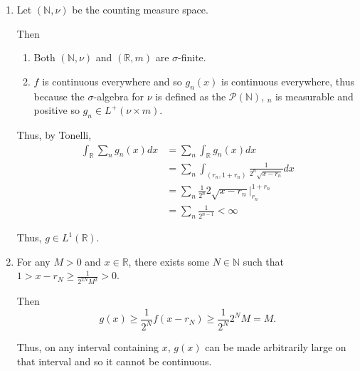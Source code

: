 \documentclass[12pt]{Homework}
\begin{document}
\begin{solution}$\,$
\begin{enumerate}[label=(\alph*)]
    \item Let $(\mathbb{N},\nu)$ be the counting measure space. 
    
    Then \begin{enumerate}[label=(\roman*)]
        \item Both $(\mathbb{N},\nu)$ and $(\mathbb{R},m)$ are $\sigma$-finite.
        \item $f$ is continuous everywhere and so $g_n(x)$ is continuous everywhere, thus because the $\sigma$-algebra for $\nu$ is defined as the $\mathscr{P}(\mathbb{N})$, $_n$ is measurable and positive so $g_n\in L^+(\nu\times m)$.
    \end{enumerate}
    
    Thus, by Tonelli, \begin{align*}
        \int_\mathbb{R}\sum_n g_n(x)dx&=\sum_n\int_\mathbb{R}g_n(x)dx\\
        &=\sum_n\int_{(r_n,1+r_n)}\frac{1}{2^n\sqrt{x-r_n}}dx\\
        &=\sum_n\frac{1}{2^n}2\sqrt{x-r_n}\bigg|_{r_n}^{1+r_n}\\
        &=\sum_n\frac{1}{2^{n-1}}<\infty
    \end{align*}
    
    Thus, $g\in L^1(\mathbb{R})$.
    \item For any $M>0$ and $x\in\mathbb{R}$, there exists some $N\in\mathbb{N}$ such that $1>x-r_N\ge\frac{1}{2^{2N}M^2}>0$.
    
    Then $$g(x)\ge \frac{1}{2^N}f(x-r_N)\ge \frac{1}{2^N}2^NM=M.$$
    
    Thus, on any interval containing $x$, $g(x)$ can be made arbitrarily large on that interval and so it cannot be continuous. 
    
\begin{comment}
    Let $x\in\mathbb{R}$ and $\varepsilon>0$ be given. Then assume that $g$ is continuous at $x$.
    
    Then for all $y$ satisfying $|y-x|<\delta$, $|g(x)-g(y)|<\varepsilon$.
    
    However, for all $\delta>0$, there exists some $N\in\mathbb{N}$ such that $x<r_N<x+\delta$. Then, $|x-r_N|<\delta$, but since $f(r_N-r_N)=0$, $$|\sum_{n=1}^\infty g_n(x)-\sum_{n=1}^\infty g_n(r_N)|=|\sum_{n=1}^Ng_n(x)-\sum_{n=1}^Ng_n(r_N)|\ge \frac{1}{2^N}$$
\end{comment}
\end{enumerate}
\end{solution}
\vspace{0.5cm}
\end{document}
